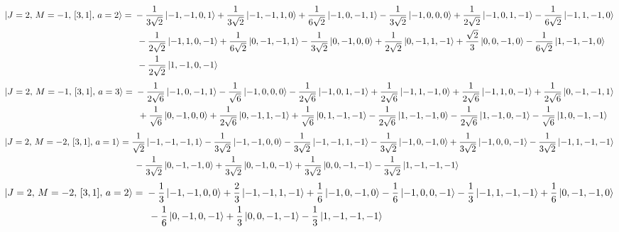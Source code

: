 \documentclass{article}
\begin{document}
{\small
\begin{equation*}
\begin{aligned}
\ket{J=2,\,M=-1,\,[3,1],\,a=2} = \; &- \frac{1}{3\sqrt{2}} \ket{-1,-1,0,1} + \frac{1}{3\sqrt{2}} \ket{-1,-1,1,0} + \frac{1}{6\sqrt{2}} \ket{-1,0,-1,1} - \frac{1}{3\sqrt{2}} \ket{-1,0,0,0} + \frac{1}{2\sqrt{2}} \ket{-1,0,1,-1} - \frac{1}{6\sqrt{2}} \ket{-1,1,-1,0} \\
  & \; - \frac{1}{2\sqrt{2}} \ket{-1,1,0,-1} + \frac{1}{6\sqrt{2}} \ket{0,-1,-1,1} - \frac{1}{3\sqrt{2}} \ket{0,-1,0,0} + \frac{1}{2\sqrt{2}} \ket{0,-1,1,-1} + \frac{\sqrt{2}}{3} \ket{0,0,-1,0} - \frac{1}{6\sqrt{2}} \ket{1,-1,-1,0} \\
  & \; - \frac{1}{2\sqrt{2}} \ket{1,-1,0,-1}
\end{aligned}
\end{equation*}}
{\small
\begin{equation*}
\begin{aligned}
\ket{J=2,\,M=-1,\,[3,1],\,a=3} = \; &- \frac{1}{2\sqrt{6}} \ket{-1,0,-1,1} - \frac{1}{\sqrt{6}} \ket{-1,0,0,0} - \frac{1}{2\sqrt{6}} \ket{-1,0,1,-1} + \frac{1}{2\sqrt{6}} \ket{-1,1,-1,0} + \frac{1}{2\sqrt{6}} \ket{-1,1,0,-1} + \frac{1}{2\sqrt{6}} \ket{0,-1,-1,1} \\
  & \; + \frac{1}{\sqrt{6}} \ket{0,-1,0,0} + \frac{1}{2\sqrt{6}} \ket{0,-1,1,-1} + \frac{1}{\sqrt{6}} \ket{0,1,-1,-1} - \frac{1}{2\sqrt{6}} \ket{1,-1,-1,0} - \frac{1}{2\sqrt{6}} \ket{1,-1,0,-1} - \frac{1}{\sqrt{6}} \ket{1,0,-1,-1}
\end{aligned}
\end{equation*}}
{\small
\begin{equation*}
\begin{aligned}
\ket{J=2,\,M=-2,\,[3,1],\,a=1} = \; &\frac{1}{\sqrt{2}} \ket{-1,-1,-1,1} - \frac{1}{3\sqrt{2}} \ket{-1,-1,0,0} - \frac{1}{3\sqrt{2}} \ket{-1,-1,1,-1} - \frac{1}{3\sqrt{2}} \ket{-1,0,-1,0} + \frac{1}{3\sqrt{2}} \ket{-1,0,0,-1} - \frac{1}{3\sqrt{2}} \ket{-1,1,-1,-1} \\
  & \; - \frac{1}{3\sqrt{2}} \ket{0,-1,-1,0} + \frac{1}{3\sqrt{2}} \ket{0,-1,0,-1} + \frac{1}{3\sqrt{2}} \ket{0,0,-1,-1} - \frac{1}{3\sqrt{2}} \ket{1,-1,-1,-1}
\end{aligned}
\end{equation*}}
{\small
\begin{equation*}
\begin{aligned}
\ket{J=2,\,M=-2,\,[3,1],\,a=2} = \; &- \frac{1}{3} \ket{-1,-1,0,0} + \frac{2}{3} \ket{-1,-1,1,-1} + \frac{1}{6} \ket{-1,0,-1,0} - \frac{1}{6} \ket{-1,0,0,-1} - \frac{1}{3} \ket{-1,1,-1,-1} + \frac{1}{6} \ket{0,-1,-1,0} \\
  & \; - \frac{1}{6} \ket{0,-1,0,-1} + \frac{1}{3} \ket{0,0,-1,-1} - \frac{1}{3} \ket{1,-1,-1,-1}
\end{aligned}
\end{equation*}}
\end{document}

